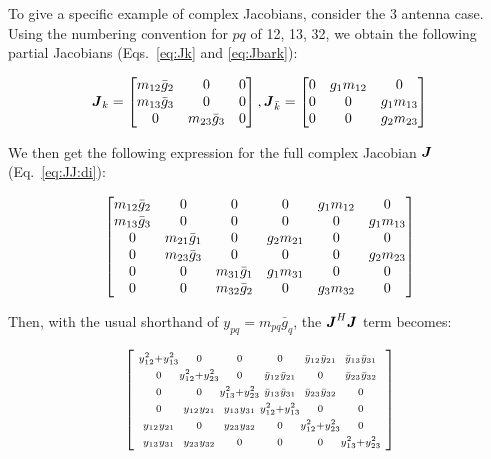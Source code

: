 \documentclass[useAMS,usenatbib]{mn2e}
\newcommand{\mat}[1]{{\bmath{#1}}}
\newcommand{\JJ}{\mat{J}} %
\begin{document}
To give a specific example of complex Jacobians, consider the 3 antenna case.
Using the numbering convention for $pq$ of 12, 13, 32, we obtain the following partial Jacobians
(Eqs.~\ref{eq:Jk} and \ref{eq:Jbark}):

\[
\JJ_k = \Matrix{ccc}{m_{12}\bar{g}_2 & 0 & 0 \\ m_{13}\bar{g}_3 & 0 & 0 \\ 0 & m_{23}\bar{g}_3 & 0 },
\JJ_{\bar{k}} = \Matrix{ccc}{0 & g_1 m_{12} & 0 \\ 0 & 0 & g_1 m_{13} \\ 0 & 0 & g_2 m_{23} }
\]

We then get the following expression
for the full complex Jacobian $\JJ$ (Eq.~\ref{eq:JJ:di}):

\begin{equation}
\label{eq:JJ:3ant}
\Matrix{cccccc}{
  m_{12}\bar{g}_2 & 0               & 0 &  0          & g_1 m_{12} & 0           \\
  m_{13}\bar{g}_3 & 0               & 0 &  0          & 0          & g_1 m_{13}  \\
  0               & m_{21}\bar{g}_1 & 0 &  g_2 m_{21} & 0          & 0  \\
  0               & m_{23}\bar{g}_3 & 0 &  0          & 0          & g_2 m_{23} \\
  0               & 0               & m_{31}\bar{g}_1 & g_1 m_{31} & 0          & 0  \\
  0               & 0               & m_{32}\bar{g}_2 & 0 & g_3 m_{32} & 0 \\
}
\end{equation}



Then, with the usual shorthand of $y_{pq} = m_{pq} \bar{g}_q$, the
$\JJ^H\JJ$ term becomes:

\begin{equation}
\label{eq:JHJ:3ant}
\Matrix{@{~}c@{}c@{}c@{}c@{}c@{}c@{~}}{
\scriptstyle\yysq{12}{13} &\scriptstyle 0             &\scriptstyle 0             &\scriptstyle 0             &\scriptstyle \bb{1}{2}       &\scriptstyle \bb{1}{3} \\
\scriptstyle0             &\scriptstyle \yysq{12}{23} &\scriptstyle 0             &\scriptstyle \bb{1}{2}       &\scriptstyle 0             &\scriptstyle \bb{2}{3} \\
\scriptstyle0             &\scriptstyle 0             &\scriptstyle \yysq{13}{23} &\scriptstyle \bb{1}{3}       &\scriptstyle \bb{2}{3}       &\scriptstyle 0       \\
\scriptstyle0             &\scriptstyle \bbb{1}{2}      &\scriptstyle \bbb{1}{3}      &\scriptstyle \yysq{12}{13} &\scriptstyle 0             &\scriptstyle 0       \\ 
\scriptstyle\bbb{1}{2}      &\scriptstyle 0             &\scriptstyle \bbb{2}{3}      &\scriptstyle 0             &\scriptstyle \yysq{12}{23} &\scriptstyle 0 \\
\scriptstyle\bbb{1}{3}      &\scriptstyle \bbb{2}{3}      &\scriptstyle 0             &\scriptstyle 0             &\scriptstyle 0             &\scriptstyle  \yysq{13}{23} \\
}
\end{equation}
\end{document}
